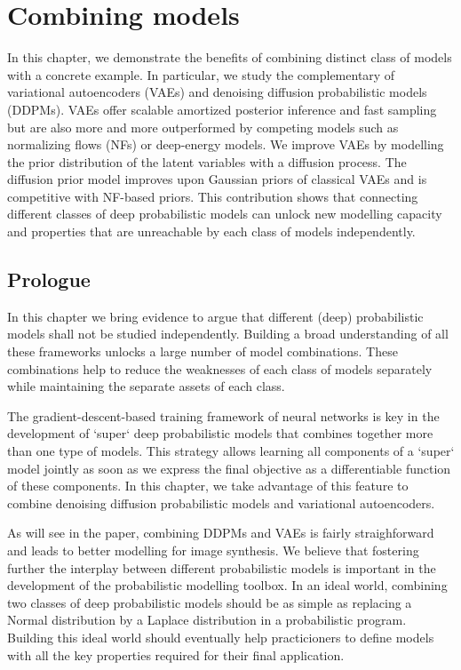\chapter{Combining models}\label{ch:03}

\begin{chapter_outline}

  In this chapter, we demonstrate the benefits of combining distinct class of models with a concrete example. In particular, we study the complementary of variational autoencoders (VAEs) and denoising diffusion probabilistic models (DDPMs). VAEs offer scalable amortized posterior inference and fast sampling but are also more and more outperformed by competing models such as normalizing flows (NFs) or deep-energy models. We improve VAEs by modelling the prior distribution of the latent variables with a diffusion process. The diffusion prior model improves upon Gaussian priors of classical VAEs and is competitive with NF-based priors.
  This contribution shows that connecting different classes of deep probabilistic models can unlock new modelling capacity and properties that are unreachable by each class of models independently.
\end{chapter_outline}
\section{Prologue}
In this chapter we bring evidence to argue that different (deep) probabilistic models shall not be studied independently. Building a broad understanding of all these frameworks unlocks a large number of model combinations. These combinations help to reduce the weaknesses of each class of models separately while maintaining the separate assets of each class.

The gradient-descent-based training framework of neural networks is key in the development of `super` deep probabilistic models that combines together more than one type of models. This strategy allows learning all components of a `super` model jointly as soon as we express the final objective as a differentiable function of these components. In this chapter, we take advantage of this feature to combine denoising diffusion probabilistic models and variational autoencoders.

As will see in the paper, combining DDPMs and VAEs is fairly straighforward and leads to better modelling for image synthesis. We believe that fostering further the interplay between different probabilistic models is important in the development of the probabilistic modelling toolbox. In an ideal world, combining two classes of deep probabilistic models should be as simple as replacing a Normal distribution by a Laplace distribution in a probabilistic program. Building this ideal world should eventually help practicioners to define models with all the key properties required for their final application.

